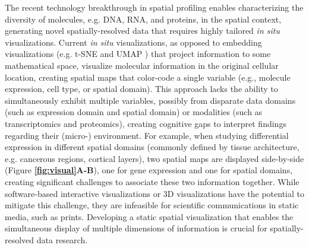 \documentclass[11pt]{article}
\begin{document}
The recent technology breakthrough in spatial profiling enables characterizing the diversity of molecules, e.g. DNA, RNA, and proteins, in the spatial context\cite{moffitt_2022}, generating novel spatially-resolved data that requires highly tailored \textit{in situ} visualizations\cite{dries_2021, Lewis_2021, odonoghue_2021}. Current \textit{in situ} visualizations, as opposed to embedding visualizations (e.g. t-SNE \cite{hinton_2002} and UMAP \cite{becht_2019}) that project information to some mathematical space, visualize molecular information in the original cellular location, creating spatial maps that color-code a single variable (e.g., molecule expression, cell type, or spatial domain). This approach lacks the ability to simultaneously exhibit multiple variables, possibly from disparate data domains (such as expression domain and spatial domain) or modalities (such as transcriptomics and proteomics), creating cognitive gaps to interpret findings regarding their (micro-) environment. For example, when studying differential expression in different spatial domains (commonly defined by tissue architecture, e.g. cancerous regions, cortical layers), two spatial maps are displayed side-by-side (Figure \textbf{\ref{fig:visual}A-B}), one for gene expression and one for spatial domains, creating significant challenges to associate these two information together. While software-based interactive visualizations\cite{sriworarat_2023} or 3D visualizations have the potential to mitigate this challenge, they are infeasible for scientific communications in static media, such as prints. Developing a static spatial visualization that enables the simultaneous display of multiple dimensions of information is crucial for spatially-resolved data research.


\end{document}
